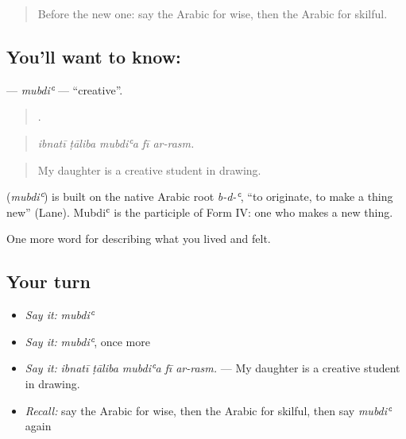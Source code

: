 \label{lesson:AR-C501-mubdi}



\begin{quote}
Before the new one: say the Arabic for wise, then the Arabic for skilful.
\end{quote}

\subsection*{You'll want to know: }
\textbf{} — \emph{mubdiʿ} — \textquotedblleft{}creative\textquotedblright{}.

\begin{quote}
    .
\end{quote}

\begin{quote}
\emph{ibnatī ṭāliba mubdiʿa fī ar-rasm.}
\end{quote}

\begin{quote}
My daughter is a creative student in drawing.
\end{quote}

\begin{cousinweb}
\textbf{} (\emph{mubdiʿ}) is built on the native Arabic root \emph{b-d-ʿ}, \textquotedblleft{}to originate, to make a thing new\textquotedblright{} (Lane). Mubdiʿ is the participle of Form IV: one who makes a new thing.
\end{cousinweb}

\begin{grammarlens}[title={What you've built}]
One more word for describing what you lived and felt.
\end{grammarlens}

\subsection*{Your turn}
\begin{itemize}
\raggedright
  \item \emph{Say it:} \emph{mubdiʿ}
  \item \emph{Say it:} \emph{mubdiʿ}, once more
  \item \emph{Say it:} \emph{ibnatī ṭāliba mubdiʿa fī ar-rasm.} — My daughter is a creative student in drawing.
  \item \emph{Recall:} say the Arabic for wise, then the Arabic for skilful, then say \emph{mubdiʿ} again
\end{itemize}

